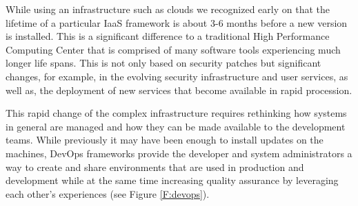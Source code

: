 \documentclass[graybox]{svmult}
\begin{document}
While using an infrastructure such as clouds we recognized early on that the lifetime of a particular IaaS framework is about 3-6 months before a new version is installed. This is a significant difference to a traditional High Performance Computing Center that is comprised of many software tools experiencing much longer life spans. This is not only based on security patches but significant changes, for example, in the evolving security infrastructure and user services, as well as, the deployment of new services that become available in rapid procession.

This rapid change of the complex infrastructure requires rethinking how systems in general are managed and how they can be made available to the development teams. While previously it may have been enough to install updates on the machines, DevOps frameworks provide the developer and system administrators a way to create and share environments that are used in production and development while at the same time increasing quality assurance by leveraging each other’s experiences (see Figure \ref{F:devops}).
\end{document}
